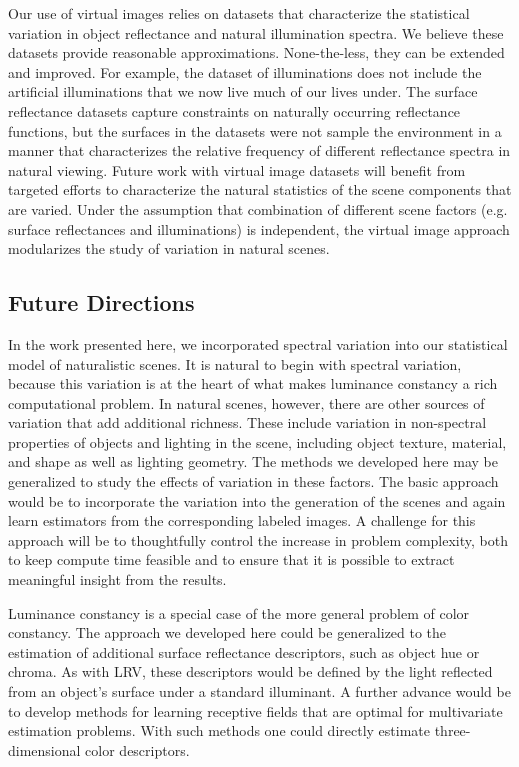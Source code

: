 \documentclass{jov}
\begin{document}
Our use of virtual images relies on datasets that characterize the statistical variation
in object reflectance and natural illumination spectra.
We believe these datasets provide reasonable approximations.
None-the-less, they can be extended and improved.
For example, the dataset of illuminations does not include the artificial illuminations
that we now live much of our lives under.
The surface reflectance datasets capture constraints on naturally occurring reflectance
functions, but the surfaces in the datasets were not sample the environment in a manner that
characterizes the relative frequency of different reflectance spectra in natural viewing.
Future work with virtual image datasets will benefit from targeted efforts to characterize
the natural statistics of the scene components that are varied.
Under the assumption that combination of different scene factors (e.g. surface reflectances
and illuminations) is independent, the virtual image approach modularizes the study
of variation in natural scenes.

\subsection{Future Directions}
In the work presented here, we incorporated spectral variation into our statistical model
of naturalistic scenes.
It is natural to begin with spectral variation, because this variation is at the heart of
what makes luminance constancy a rich computational problem.
In natural scenes, however, there are other sources of variation that add additional
richness.
These include variation in non-spectral properties of objects and lighting in the scene, including
object texture, material, and shape as well as lighting geometry.
The methods we developed here may be generalized to study the effects of variation
in these factors.
The basic approach would be to incorporate the variation into the generation of the
scenes and again learn estimators from the corresponding labeled images.
A challenge for this approach will be to thoughtfully control the increase in problem
complexity, both to keep compute time feasible and to ensure that it is possible to
extract meaningful insight from the results.

Luminance constancy is a special case of the more general problem of color constancy.
The approach we developed here could be generalized to the estimation of additional
surface reflectance descriptors, such as object hue or chroma.
As with LRV, these descriptors would be defined by the light reflected from an object's
surface   under a standard illuminant.
A further advance would be to develop methods for learning receptive fields that are
optimal for multivariate estimation problems.
With such methods one could directly estimate three-dimensional color descriptors.
\end{document}
